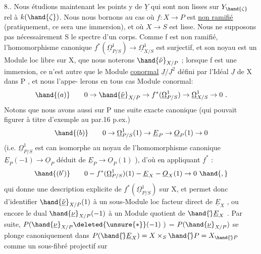 
8.. Nous étudions maintenant les points  y de $\underline{Y}$ qui sont non lisses
sur $Y_{\hand{\zeta}}$ rel à $k(\hand{\zeta})$. Nous nous  bornons au cas où  $f:X\to P$  est \uline{non ramifié}
(pratiquement, ce sera une immersion), et où $X\to S$ est lisse.  Nous ne
supposons pas nécessairement S le spectre d'un corps.  
 Comme
f  est non ramifié, l'homomorphisme canonique   $f^*(\underline{\Omega}^1_{P/S})\to\underline{\Omega}^1_{X/S}$
est surjectif, et son noyau est un Module loc libre sur X, que nous
noterons  $\hand{\check{\nu}}_{X/P}$ ; lorsque f est une immersion, ce n'est autre que le
Module \uline{conormal}  $\underline{J}/\underline{J}^2$  défini par l'Idéal $\underline{J}$ de X dans P , et nous l'appe-%
lerons en tous cas Module conormal:
\[ \hand{(a)} \qquad 0\to\hand{\check{\underline{\nu}}}_{X/P}\to f^*(\underline{\Omega}^1_{P/S})\to\underline{\Omega}^1_{X/S}\to 0 \ . \]
 Notons que nous avons aussi sur  P  une suite exacte canonique
(qui pouvait figurer à titre d'exemple au par.16 p.ex.)
\[ \hand{(b)} \qquad 0\to\underline{\Omega}^1_{P/S}(1)\to\underline{E}_P\to\underline{O}_P(1)\to 0 \]
(i.e. $\underline{\Omega}^1_{P/S}$ est can isomorphe au noyau de l'homomorphisme canonique
$\underline{E}_P(-1)\to\underline{O}_P$  déduit de $\underline{E}_P\to\underline{O}_P(1)$ ), d'où en appliquant $f^*$ :
\[ \hand{(b')} \qquad 0 - f^*(\underline{\Omega}^1_{P/S})(1) - \underline{E}_X - \underline{O}_X(1)\to 0 \ \hand{,} \]
qui donne une description explicite de  $f^*(\underline{\Omega}^1_{P/S})$   sur X, et
permet  donc d'identifier $\hand{\check{\underline{\nu}}}_{X/P}(1)$  à un sous-Module loc facteur direct
de $\underline{E}_X$ , ou encore le  dual  $\hand{\underline{\nu}}_{X/P}(-1)$  à un Module
quotient de $\hand{\check{}}\underline{E}_X$ .  Par suite,   $P(\hand{\underline{\nu}}_{X/P}\deleted{\unsure{*}}(-1)\ )$  =  $P(\hand{\underline{\nu}}_{X/P})$  se plonge
canoniquement dans  $P(\hand{\check{}}\underline{E}_X) = X\times_S\hand{\check{}}P = X_{\hand{\check{}}P}$ comme un sous-fibré projectif sur
